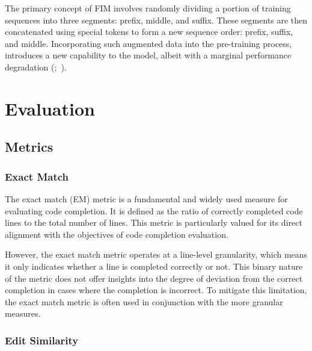 The primary concept of FIM involves randomly dividing a portion of training sequences into three segments: prefix, middle, and suffix. These segments are then concatenated using special tokens to form a new sequence order: prefix, suffix, and middle. Incorporating such augmented data into the pre-training process, introduces a new capability to the model, albeit with a marginal performance degradation (\cite{allal2023};~\cite{rozière2023}).


\section{Evaluation}


\subsection{Metrics}


\subsubsection*{Exact Match}

The exact match (EM) metric is a fundamental and widely used measure for evaluating code completion. It is defined as the ratio of correctly completed code lines to the total number of lines. This metric is particularly valued for its direct alignment with the objectives of code completion evaluation.

However, the exact match metric operates at a line-level granularity, which means it only indicates whether a line is completed correctly or not. This binary nature of the metric does not offer insights into the degree of deviation from the correct completion in cases where the completion is incorrect. To mitigate this limitation, the exact match metric is often used in conjunction with the more granular measures.

\subsubsection*{Edit Similarity}

